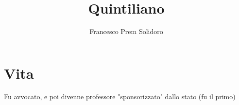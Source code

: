 \documentclass{article}
\title{Quintiliano}
\author{Francesco Prem Solidoro}
\begin{document}
	\maketitle
\section{Vita}
Fu avvocato, e poi divenne professore "sponsorizzato" dallo stato (fu il primo)
\end{document}
